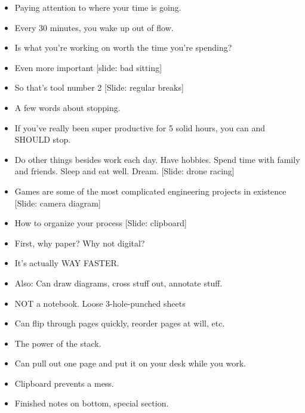 \documentclass[12pt]{article}
\begin{document}
{\begin{itemize}
\item Paying attention to where your time is going.

\item Every 30 minutes, you wake up out of flow.

\item Is what you're working on worth the time you're spending?

\item Even more important [slide:  bad sitting]

\item So that's tool number 2 [Slide:  regular breaks]


\item A few words about stopping.  

\item If you've really been super productive for 5 solid hours, you can and SHOULD stop.

\item Do other things besides work each day.  Have hobbies.  Spend time with family and friends.  Sleep and eat well.  Dream. [Slide:  drone racing]


\item Games are some of the most complicated engineering projects in existence [Slide: camera diagram]

\item How to organize your process [Slide: clipboard]

\item First, why paper?  Why not digital?

\item It's actually WAY FASTER.

\item Also:  Can draw diagrams, cross stuff out, annotate stuff.

\item NOT a notebook.  Loose 3-hole-punched sheets

\item Can flip through pages quickly, reorder pages at will, etc.

\item The power of the stack.

\item Can pull out one page and put it on your desk while you work.

\item Clipboard prevents a mess.

\item Finished notes on bottom, special section.


\end{itemize}}
\end{document}
